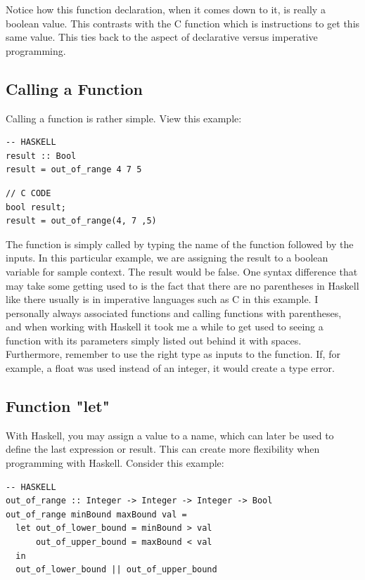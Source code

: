 \documentclass{article}
\begin{document}
\medskip\noindent
Notice how this function declaration, when it comes down to it, is really a boolean value. This contrasts with the C function which is instructions to get this same value. This ties back to the aspect of declarative versus imperative programming.

\subsection{Calling a Function}
\medskip\noindent
Calling a function is rather simple. View this example:

\begin{lstlisting}[style=HaskellStyle]
-- HASKELL
result :: Bool
result = out_of_range 4 7 5
\end{lstlisting}

\begin{lstlisting}[style=CStyle]
// C CODE
bool result;
result = out_of_range(4, 7 ,5)
\end{lstlisting}

\medskip\noindent
The function is simply called by typing the name of the function followed by the inputs. In this particular example, we are assigning the result to a boolean variable for sample context. The result would be false. One syntax difference that may take some getting used to is the fact that there are no parentheses in Haskell like there usually is in imperative languages such as C in this example. I personally always associated functions and calling functions with parentheses, and when working with Haskell it took me a while to get used to seeing a function with its parameters simply listed out behind it with spaces. Furthermore, remember to use the right type as inputs to the function. If, for example, a float was used instead of an integer, it would create a type error.

\subsection{Function "let"}
\medskip\noindent
With Haskell, you may assign a value to a name, which can later be used to define the last expression or result. This can create more flexibility when programming with Haskell. Consider this example:

\begin{lstlisting}[style=HaskellStyle]
-- HASKELL
out_of_range :: Integer -> Integer -> Integer -> Bool
out_of_range minBound maxBound val =
  let out_of_lower_bound = minBound > val
      out_of_upper_bound = maxBound < val
  in
  out_of_lower_bound || out_of_upper_bound
\end{lstlisting}
\end{document}
